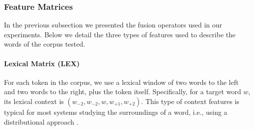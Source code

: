 \begin{enumerate}
	\end{enumerate}   
\subsubsection{Feature Matrices}
In the previous subsection we presented the fusion operators used in our experiments. Below we detail the three types of features used to describe the words of the corpus tested.
\paragraph{Lexical Matrix (LEX)}
For each token in the corpus, we use a lexical window of two words to the left and two words to the right, plus the token itself. Specifically, for a target word $w$, its lexical context is $(w_{-2}, w_{-2}, w, w_{+1}, w_{+2})$. This type of context features is typical for most systems studying the surroundings of a word, i.e., using a distributional approach \cite{LevyG14}.


